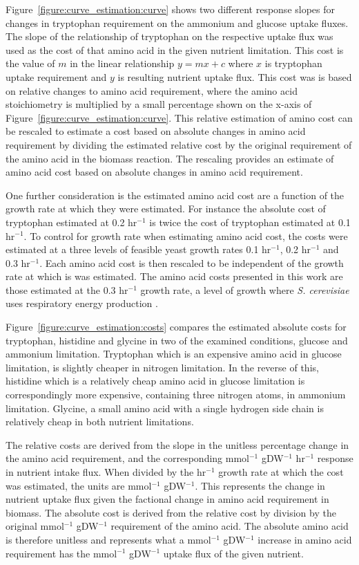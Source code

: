 Figure~\ref{figure:curve_estimation:curve} shows two different response slopes for changes in tryptophan requirement on the ammonium and glucose uptake fluxes. The slope of the relationship of tryptophan on the respective uptake flux was used as the cost of that amino acid in the given nutrient limitation. This cost is the value of $m$ in the linear relationship $y = mx + c$ where $x$ is tryptophan uptake requirement and $y$ is resulting nutrient uptake flux. This cost was is based on relative changes to amino acid requirement, where the amino acid stoichiometry is multiplied by a small percentage shown on the x-axis of Figure~\vref{figure:curve_estimation:curve}. This relative estimation of amino cost can be rescaled to estimate a cost based on absolute changes in amino acid requirement by dividing the estimated relative cost by the original requirement of the amino acid in the biomass reaction. The rescaling provides an estimate of amino acid cost based on absolute changes in amino acid requirement.

One further consideration is the estimated amino acid cost are a function of the growth rate at which they were estimated. For instance the absolute cost of tryptophan estimated at 0.2 hr$^{-1}$ is twice the cost of tryptophan estimated at 0.1 hr$^{-1}$. To control for growth rate when estimating amino acid cost, the costs were estimated at a three levels of feasible yeast growth rates 0.1 hr$^{-1}$, 0.2 hr$^{-1}$ and 0.3 hr$^{-1}$. Each amino acid cost is then rescaled to be independent of the growth rate at which is was estimated. The amino acid costs presented in this work are those estimated at the 0.3 hr$^{-1}$ growth rate, a level of growth where \emph{S. cerevisiae} uses respiratory energy production \cite{famili2003}.

Figure~\ref{figure:curve_estimation:costs} compares the estimated absolute costs for tryptophan, histidine and glycine in two of the examined conditions, glucose and ammonium limitation. Tryptophan which is an expensive amino acid in glucose limitation, is slightly cheaper in nitrogen limitation. In the reverse of this, histidine which is a relatively cheap amino acid in glucose limitation is correspondingly more expensive, containing three nitrogen atoms, in ammonium limitation. Glycine, a small amino acid with a single hydrogen side chain is relatively cheap in both nutrient limitations.

The relative costs are derived from the slope in the unitless percentage change in the amino acid requirement, and the corresponding mmol$^{-1}$ gDW$^{-1}$ hr$^{-1}$ response in nutrient intake flux. When divided by the hr$^{-1}$ growth rate at which the cost was estimated, the units are mmol$^{-1}$ gDW$^{-1}$. This represents the change in nutrient uptake flux given the factional change in amino acid requirement in biomass. The absolute cost is derived from the relative cost by division by the original mmol$^{-1}$ gDW$^{-1}$ requirement of the amino acid. The absolute amino acid is therefore unitless and represents what a mmol$^{-1}$ gDW$^{-1}$ increase in amino acid requirement has the mmol$^{-1}$ gDW$^{-1}$ uptake flux of the given nutrient.

